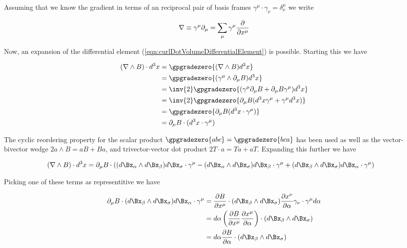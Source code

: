 Assuming that we know the gradient in terms of an reciprocal pair of basis frames $\gamma^\mu \cdot \gamma_\nu = \delta^\mu_\nu$ we write

\begin{align}\label{eqn:gradientDefined}
\nabla \equiv \gamma^\mu \partial_\mu = \sum_\mu \gamma^\mu \frac{\partial {}}{\partial {x^\mu}}
\end{align}

Now, an expansion of the differential element (\ref{eqn:curlDotVolumeDifferentialElement}) is possible.  Starting this we have

\begin{align*}
(\grad \wedge B) \cdot d^3 x
&=
\gpgradezero{ (\grad \wedge B) d^3 x } \\
&=
\gpgradezero{ (\gamma^\mu \wedge \partial_\mu B) d^3 x } \\
&=
\inv{2} \gpgradezero{ (\gamma^\mu \partial_\mu B + \partial_\mu B \gamma^\mu) d^3 x } \\
&=
\inv{2} \gpgradezero{ \partial_\mu B (d^3 x \gamma^\mu + \gamma^\mu d^3 x) } \\
&=
\gpgradezero{ \partial_\mu B (d^3 x \cdot \gamma^\mu) } \\
&=
\partial_\mu B \cdot (d^3 x \cdot \gamma^\mu)
\end{align*}

The cyclic reordering property for the scalar product $\gpgradezero{a b c} = \gpgradezero{ b c a}$ has been used as well as the vector-bivector wedge $2 a \wedge B = a B + B a$, and trivector-vector dot product $2 T \cdot a = T a + a T$.  Expanding this further we have

\begin{align*}
(\grad \wedge B) \cdot d^3 x
&=
\partial_\mu B \cdot \left(
 (d\Bx_\alpha \wedge d\Bx_\beta) d\Bx_\sigma \cdot \gamma^\mu
-(d\Bx_\alpha \wedge d\Bx_\sigma) d\Bx_\beta \cdot \gamma^\mu
+(d\Bx_\beta  \wedge d\Bx_\sigma) d\Bx_\alpha \cdot \gamma^\mu
\right)
\end{align*}

Picking one of these terms as representitive we have

\begin{align*}
\partial_\mu B \cdot (d\Bx_\beta \wedge d\Bx_\sigma) d\Bx_\alpha \cdot \gamma^\mu
&=
\PD{x^\mu}{B} \cdot (d\Bx_\beta \wedge d\Bx_\sigma) \PD{\alpha}{x^\nu} \gamma_\nu \cdot \gamma^\mu d\alpha \\
&=
d\alpha \left( \PD{x^\mu}{B} \PD{\alpha}{x^\mu} \right) \cdot (d\Bx_\beta \wedge d\Bx_\sigma) \\
&=
d\alpha \PD{\alpha}{B} \cdot (d\Bx_\beta \wedge d\Bx_\sigma) \\
\end{align*}

